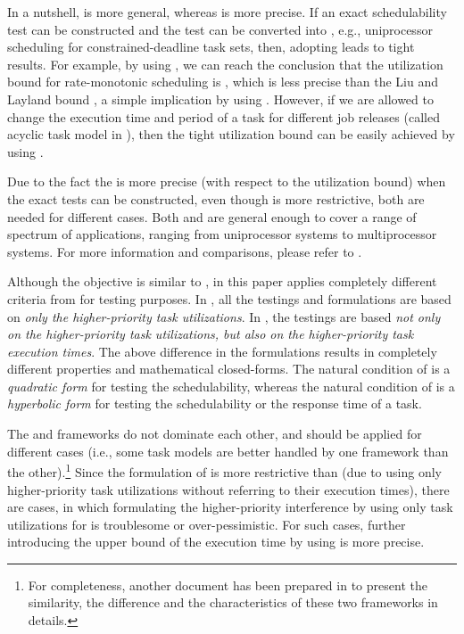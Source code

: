 \documentclass[10pt,conference]{IEEEtran}
\newcommand{\frameworkkq}[1]{}
\newcommand{\frameworkku}[1]{}
\begin{document}
{In a nutshell, \frameworkkq{} is more general, whereas \frameworkku{} is
more precise. If an exact schedulability test can
be constructed and the test can be converted into \frameworkku{},
e.g., uniprocessor scheduling for constrained-deadline task sets,
then, adopting \frameworkku{} leads to tight results. For example, by using
\frameworkkq{}, we can reach the conclusion that the utilization bound
for rate-monotonic scheduling is , which is
less precise than the Liu and Layland bound ,
 a simple implication by using \frameworkku{}. However, if we
are allowed to change the execution time and period of a task for
different job releases (called acyclic task model in
\cite{DBLP:journals/tc/AbdelzaherSL04}), then the tight utilization bound
 can be easily achieved by using \frameworkkq{}. 

Due to the fact the \frameworkku{} is more precise (with respect to the utilization bound) when the exact
tests can be constructed, even though \frameworkku{} is more
restrictive, both are needed for different
cases. Both \frameworkku{} and \frameworkkq{} are general enough to cover a range of spectrum of
applications, ranging from uniprocessor systems to multiprocessor
systems.  For more information and comparisons, please refer to
\cite{DBLP:journals/corr/framework-compare}.

}{
Although the objective is similar to \frameworkku{}, 
\frameworkkq{} in this paper applies completely different criteria from
\frameworkku{} for testing purposes. In \frameworkku{}, all the
testings and formulations are based on \emph{only the higher-priority
  task utilizations}. In \frameworkkq{}, the testings are based
\emph{not only on the higher-priority task utilizations, but also on
  the higher-priority task execution times}.  The above difference in
the formulations results in completely different properties and
mathematical closed-forms.  The natural condition of \frameworkkq{} is
a \emph{quadratic form} for testing the schedulability, whereas the
natural condition of \frameworkku{} is a \emph{hyperbolic form} for
testing the schedulability or the response time of a task.

The  \frameworkkq{} and \frameworkku{} frameworks do not dominate each other, and should be applied for different cases (i.e., some task models are better handled by one framework than the other).\footnote{For completeness, another document has been prepared in \cite{DBLP:journals/corr/framework-compare} to present the similarity, the difference and the characteristics of these two frameworks in details.}
Since the formulation of \frameworkku{} is more restrictive than
\frameworkkq{} (due to using only higher-priority task utilizations
without referring to their execution times), there are cases, in which
formulating the higher-priority interference by using only task
utilizations for \frameworkku{} is troublesome or over-pessimistic. For such cases,
further introducing the upper bound of the execution time by using
\frameworkkq{} is more precise. 
}
\end{document}
